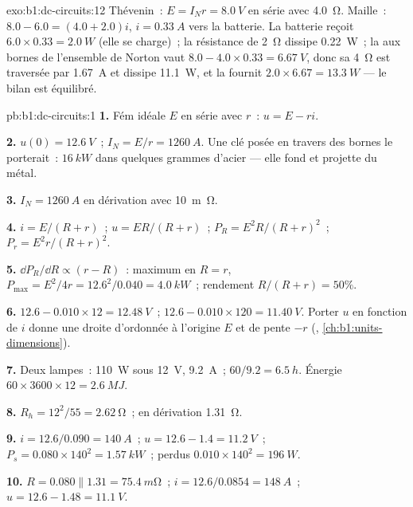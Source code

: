 \begin{solution}{exo:b1:dc-circuits:12}
Thévenin~: $E = I_N r = \qty{8.0}{V}$ en série avec \qty{4.0}{\ohm}.
Maille~: $8.0 - 6.0 = (4.0 + 2.0)i$, $i = \qty{0.33}{A}$ vers la
batterie. La batterie reçoit $6.0 \times 0.33 = \qty{2.0}{W}$ (elle se
charge)~; la résistance de \qty{2}{\ohm} dissipe \qty{0.22}{W}~; la
 aux bornes de l'ensemble de Norton vaut
$8.0 - 4.0 \times 0.33 = \qty{6.67}{V}$, donc sa \qty{4}{\ohm} est
traversée par \qty{1.67}{A} et dissipe \qty{11.1}{W}, et la  fournit $2.0 \times 6.67 = \qty{13.3}{W}$ --- le bilan est
équilibré.
\end{solution}

\begin{solution}{pb:b1:dc-circuits:1}
\textbf{1.} Fém idéale $E$ en série avec $r$~: $u = E - ri$.

\textbf{2.} $u(0) = \qty{12.6}{V}$~; $I_N = E/r = \qty{1260}{A}$. Une clé
posée en travers des bornes le porterait~: $\qty{16}{kW}$ dans quelques
grammes d'acier --- elle fond et projette du métal.

\textbf{3.}  $I_N = \qty{1260}{A}$ en dérivation avec
\qty{10}{m\ohm}.

\textbf{4.} $i = E/(R + r)$~; $u = ER/(R + r)$~; $P_R = E^2R/(R + r)^2$~;
$P_r = E^2r/(R + r)^2$.

\textbf{5.} $\dd P_R/\dd R \propto (r - R)$~: maximum en $R = r$,
$P_{\max} = E^2/4r = 12.6^2/0.040 = \qty{4.0}{kW}$~; rendement
$R/(R + r) = 50\%$.

\textbf{6.} $12.6 - 0.010 \times 12 = \qty{12.48}{V}$~; $12.6 - 0.010 \times
120 = \qty{11.40}{V}$. Porter $u$ en fonction de $i$ donne une droite
d'ordonnée à l'origine $E$ et de pente $-r$ (, \cref{ch:b1:units-dimensions}).

\textbf{7.} Deux lampes~: \qty{110}{W} sous \qty{12}{V}, \qty{9.2}{A}~;
$60/9.2 = \qty{6.5}{h}$. Énergie $60 \times 3600 \times 12 = \qty{2.6}{MJ}$.

\textbf{8.} $R_h = 12^2/55 = \qty{2.62}{\ohm}$~; en dérivation \qty{1.31}{\ohm}.

\textbf{9.} $i = 12.6/0.090 = \qty{140}{A}$~; $u = 12.6 - 1.4 = \qty{11.2}{V}$~;
$P_s = 0.080 \times 140^2 = \qty{1.57}{kW}$~; perdus $0.010 \times 140^2 =
\qty{196}{W}$.

\textbf{10.} $R = 0.080 \parallel 1.31 = \qty{75.4}{m\ohm}$~; $i = 12.6/0.0854
= \qty{148}{A}$~; $u = 12.6 - 1.48 = \qty{11.1}{V}$.


\end{solution}
